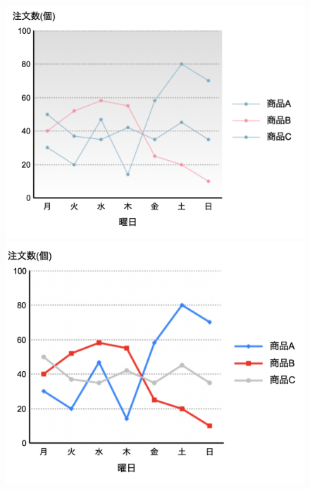 \begin{figure}[H]
\begin{minipage}[b]{.23\textwidth}
        \includegraphics[keepaspectratio,width=\textwidth]{../../10_UniversalDesign/no2_line_CC_T.png}
    \end{minipage}
    \begin{minipage}[b]{.23\textwidth}
        \centering
        \includegraphics[keepaspectratio,width=\textwidth]{../../10_UniversalDesign/no2_line_reviced.png}
    \end{minipage}
    \begin{minipage}[b]{.23\textwidth}
        \centering

\end{minipage}
\end{figure}
